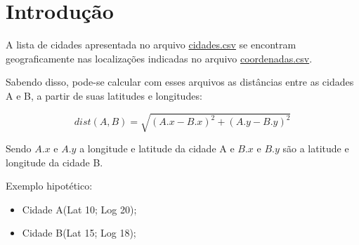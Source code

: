 \documentclass[12pt,a4paper]{article}
\begin{document}
\thispagestyle{empty}

\large
\section*{Introdução}

A lista de cidades apresentada no arquivo {\color{blue}\href{https://github.com/kennedyufersa/hashTable/blob/main/bancoDeDados/coordenadas.csv}{cidades.csv}} se encontram geograficamente nas localizações indicadas no arquivo {\color{blue}\href{https://github.com/kennedyufersa/hashTable/blob/main/bancoDeDados/coordenadas.csv}{coordenadas.csv}}. 

Sabendo disso, pode-se calcular com esses arquivos as distâncias entre as cidades A e B, a partir de suas latitudes e longitudes:

$$dist(A,B) = \sqrt{(A.x - B.x)^2 + (A.y - B.y)^2}$$

Sendo $A.x$ e $A.y$ a longitude e latitude da cidade A e $B.x$ e $B.y$ são a latitude e longitude da cidade B.

Exemplo hipotético:
\begin{itemize}
    \item Cidade A(Lat 10; Log 20);
    \item Cidade B(Lat 15; Log 18);
\end{itemize}
\end{document}
